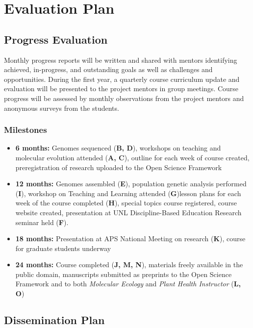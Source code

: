 \documentclass[12pt,letterpaper]{article}
\begin{document}

\section{Evaluation Plan}

\subsection{Progress Evaluation}

Monthly progress reports will be written and shared with mentors identifying achieved, in-progress, and outstanding goals as well as challenges and opportunities. During the first year, a quarterly course curriculum update and evaluation will be presented to the project mentors in group meetings. Course progress will be assessed by monthly observations from the project mentors and anonymous surveys from the students. 

\subsubsection*{Milestones}
\begin{itemize}
  \item \textbf{6 months:} Genomes sequenced (\textbf{B, D}), workshops on teaching and molecular evolution attended (\textbf{A, C}), outline for each week of course created, preregistration of research uploaded to the Open Science Framework
  \item \textbf{12 months:} Genomes assembled (\textbf{E}), population genetic analysis performed (\textbf{I}), workshop on Teaching and Learning attended (\textbf{G})lesson plans for each week of the course completed (\textbf{H}), special topics course registered, course website created, presentation at UNL Discipline-Based Education Research seminar held (\textbf{F}).
  \item \textbf{18 months:} Presentation at APS National Meeting on research (\textbf{K}), course for graduate students underway
  \item \textbf{24 months:} Course completed (\textbf{J, M, N}), materials freely available in the public domain, manuscripts submitted as preprints to the Open Science Framework and to both \textit{Molecular Ecology} and \textit{Plant Health Instructor} (\textbf{L, O})
\end{itemize}

\subsection{Dissemination Plan}
\end{document}
